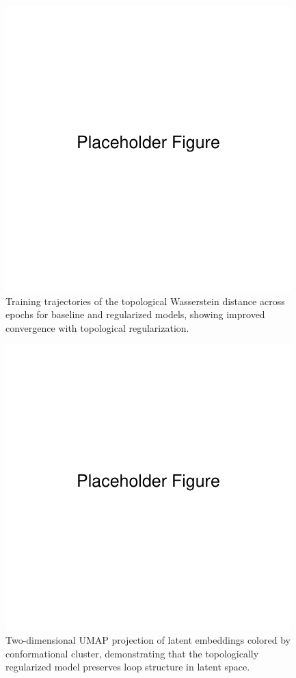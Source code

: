 \documentclass[11pt]{article}
\begin{document}
\begin{figure}[t]
    \centering
    \includegraphics[width=0.75\linewidth]{figures/placeholder.pdf}
    \caption{Training trajectories of the topological Wasserstein distance across epochs for baseline and regularized models, showing improved convergence with topological regularization.}
    \label{fig:wasserstein_epochs}
\end{figure}

\begin{figure}[t]
    \centering
    \includegraphics[width=0.75\linewidth]{figures/placeholder.pdf}
    \caption{Two-dimensional UMAP projection of latent embeddings colored by conformational cluster, demonstrating that the topologically regularized model preserves loop structure in latent space.}
    \label{fig:latent_umap}
\end{figure}
\end{document}
